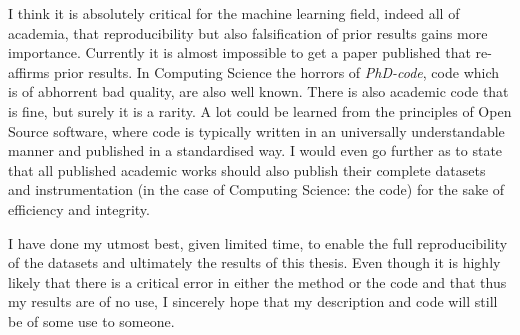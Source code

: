 I think it is absolutely critical for the machine learning field, indeed all of academia,
that reproducibility but also falsification of prior results gains more importance.
Currently it is almost impossible to get a paper published that re-affirms prior results.
In Computing Science the horrors of \emph{PhD-code}, code which is of abhorrent bad quality, are also well known.
There is also academic code that is fine, but surely it is a rarity.
A lot could be learned from the principles of Open Source software, where code is typically written
in an universally understandable manner and published in a standardised way.
I would even go further as to state that all published academic works should also publish
their complete datasets and instrumentation (in the case of Computing Science: the code)
for the sake of efficiency and integrity.

I have done my utmost best, given limited time, to enable the full reproducibility of
the datasets and ultimately the results of this thesis.
Even though it is highly likely that there is a critical error in either the method
or the code and that thus my results are of no use,
I sincerely hope that my description and code will still be of some use to someone.